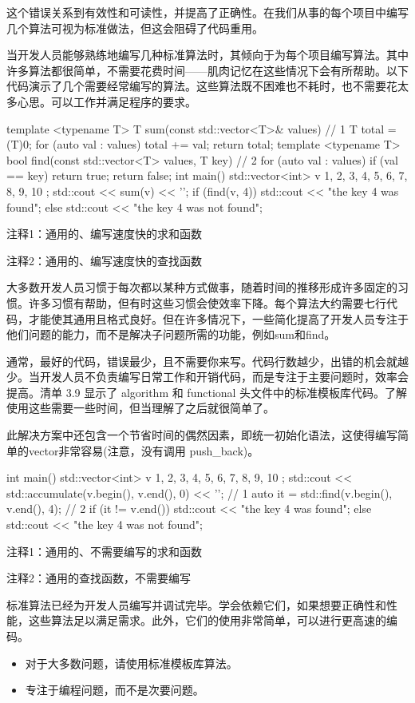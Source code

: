 这个错误关系到有效性和可读性，并提高了正确性。在我们从事的每个项目中编写几个算法可视为标准做法，但这会阻碍了代码重用。


当开发人员能够熟练地编写几种标准算法时，其倾向于为每个项目编写算法。其中许多算法都很简单，不需要花费时间——肌肉记忆在这些情况下会有所帮助。以下代码演示了几个需要经常编写的算法。这些算法既不困难也不耗时，也不需要花太多心思。可以工作并满足程序的要求。


\begin{cpp}
template <typename T>
T sum(const std::vector<T>& values) { // 1
  T total = (T)0;
  for (auto val : values)
  total += val;
  return total;
}
template <typename T>
bool find(const std::vector<T> values, T key) { // 2
  for (auto val : values)
    if (val == key)
      return true;
  return false;
}
int main() {
  std::vector<int> v { 1, 2, 3, 4, 5, 6, 7, 8, 9, 10 };
  std::cout << sum(v) << '\n';
  if (find(v, 4))
    std::cout << "the key 4 was found\n";
  else
    std::cout << "the key 4 was not found\n";
}
\end{cpp}

{\footnotesize
注释1：通用的、编写速度快的求和函数

注释2：通用的、编写速度快的查找函数
}


大多数开发人员习惯于每次都以某种方式做事，随着时间的推移形成许多固定的习惯。许多习惯有帮助，但有时这些习惯会使效率下降。每个算法大约需要七行代码，才能使其通用且格式良好。但在许多情况下，一些简化提高了开发人员专注于他们问题的能力，而不是解决子问题所需的功能，例如sum和find。


通常，最好的代码，错误最少，且不需要你来写。代码行数越少，出错的机会就越少。当开发人员不负责编写日常工作和开销代码，而是专注于主要问题时，效率会提高。清单 3.9 显示了 algorithm 和 functional 头文件中的标准模板库代码。了解使用这些需要一些时间，但当理解了之后就很简单了。

此解决方案中还包含一个节省时间的偶然因素，即统一初始化语法，这使得编写简单的vector非常容易(注意，没有调用 push\_back)。


\begin{cpp}
int main() {
  std::vector<int> v { 1, 2, 3, 4, 5, 6, 7, 8, 9, 10 };
  std::cout << std::accumulate(v.begin(), v.end(), 0) << '\n'; // 1
  auto it = std::find(v.begin(), v.end(), 4); // 2
  if (it != v.end())
    std::cout << "the key 4 was found\n";
  else
    std::cout << "the key 4 was not found\n";
}
\end{cpp}

{\footnotesize
注释1：通用的、不需要编写的求和函数

注释2：通用的查找函数，不需要编写
}

标准算法已经为开发人员编写并调试完毕。学会依赖它们，如果想要正确性和性能，这些算法足以满足需求。此外，它们的使用非常简单，可以进行更高速的编码。


\begin{itemize}
\item
对于大多数问题，请使用标准模板库算法。

\item
专注于编程问题，而不是次要问题。
\end{itemize}




